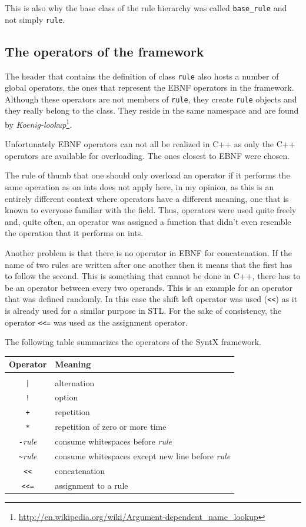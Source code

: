 \documentclass[12pt]{article}
\newcommand{\usubsec}[2]{\subsection*{#1}\label{subsec:#2}\addcontentsline{toc}{subsection}{#1}}
\begin{document}
This is also why the base class of the rule hierarchy was called \texttt{base\_rule} and not simply
\texttt{rule}.

\usubsec{The operators of the framework}{operators}
The header that contains the definition of class \texttt{rule} also hosts a number of global operators, the
ones that represent the EBNF operators in the framework. Although these operators are not members of
\texttt{rule}, they create \texttt{rule} objects and they really belong to the class. They reside in the same
namespace and are found by
\emph{Koenig-lookup}\footnote{\href{http://en.wikipedia.org/wiki/Argument-dependent_name_lookup}{http://en.wikipedia.org/wiki/Argument-dependent\_name\_lookup}}.

Unfortunately EBNF operators can not all be realized in C++ as only the C++ operators are available for
overloading. The ones closest to EBNF were chosen.

The rule of thumb that one should only overload an operator if it performs the same operation as on ints does
not apply here, in my opinion, as this is an entirely different context where operators have a different
meaning, one that is known to everyone familiar with the field. Thus, operators were used quite freely and,
quite often, an operator was assigned a function that didn't even resemble the operation that it performs
on ints.

Another problem is that there is no operator in EBNF for concatenation. If the name of two rules are written
after one another then it means that the first has to follow the second. This is something that cannot be done
in C++, there has to be an operator between every two operands. This is an example for an operator that was
defined randomly. In this case the shift left operator was used (\verb!<<!) as it is already used for a
similar purpose in STL. For the sake of consistency, the operator \verb!<<=! was used as the assignment
operator.

The following table summarizes the operators of the SyntX framework.

\begin{table}[h]
	\begin{center}
		\begin{tabular}{cp{22em}}
			\textbf{Operator} & \textbf{Meaning} \\
			\hline\\
			\vspace{0.3em}
			\verb!|! & alternation\\
			\verb+!+ & option\\
			\verb!+! & repetition\\
			\verb!*! & repetition of zero or more time\\
			\verb!-!\textit{rule} & consume whitespaces before \textit{rule}\\
			\verb!~!\textit{rule} & consume whitespaces except new line before \textit{rule} \\
			\verb!<<! & concatenation\\
			\verb!<<=! & assignment to a rule\\
		\end{tabular}
	\end{center}
\end{table}
\end{document}
